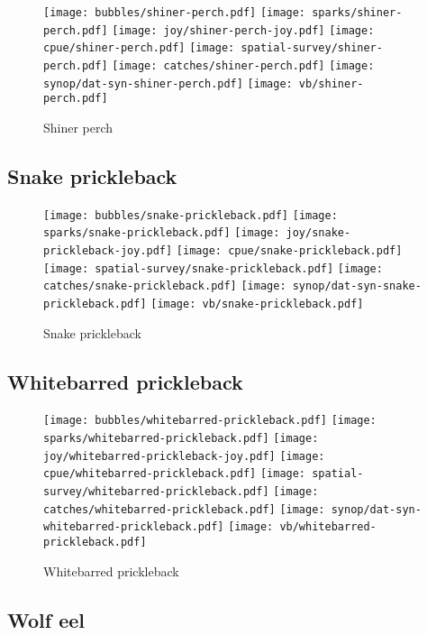 \begin{figure}[htbp]
\centering
\texttt{[image: bubbles/shiner-perch.pdf]}
\texttt{[image: sparks/shiner-perch.pdf]}
\texttt{[image: joy/shiner-perch-joy.pdf]}
\texttt{[image: cpue/shiner-perch.pdf]}
\texttt{[image: spatial-survey/shiner-perch.pdf]}
\texttt{[image: catches/shiner-perch.pdf]}
\texttt{[image: synop/dat-syn-shiner-perch.pdf]}
\texttt{[image: vb/shiner-perch.pdf]}
\caption{Shiner perch}
\end{figure}
\clearpage
\subsection*{Snake prickleback}

\begin{figure}[htbp]
\centering
\texttt{[image: bubbles/snake-prickleback.pdf]}
\texttt{[image: sparks/snake-prickleback.pdf]}
\texttt{[image: joy/snake-prickleback-joy.pdf]}
\texttt{[image: cpue/snake-prickleback.pdf]}
\texttt{[image: spatial-survey/snake-prickleback.pdf]}
\texttt{[image: catches/snake-prickleback.pdf]}
\texttt{[image: synop/dat-syn-snake-prickleback.pdf]}
\texttt{[image: vb/snake-prickleback.pdf]}
\caption{Snake prickleback}
\end{figure}
\clearpage
\subsection*{Whitebarred prickleback}

\begin{figure}[htbp]
\centering
\texttt{[image: bubbles/whitebarred-prickleback.pdf]}
\texttt{[image: sparks/whitebarred-prickleback.pdf]}
\texttt{[image: joy/whitebarred-prickleback-joy.pdf]}
\texttt{[image: cpue/whitebarred-prickleback.pdf]}
\texttt{[image: spatial-survey/whitebarred-prickleback.pdf]}
\texttt{[image: catches/whitebarred-prickleback.pdf]}
\texttt{[image: synop/dat-syn-whitebarred-prickleback.pdf]}
\texttt{[image: vb/whitebarred-prickleback.pdf]}
\caption{Whitebarred prickleback}
\end{figure}
\clearpage
\subsection*{Wolf eel}


